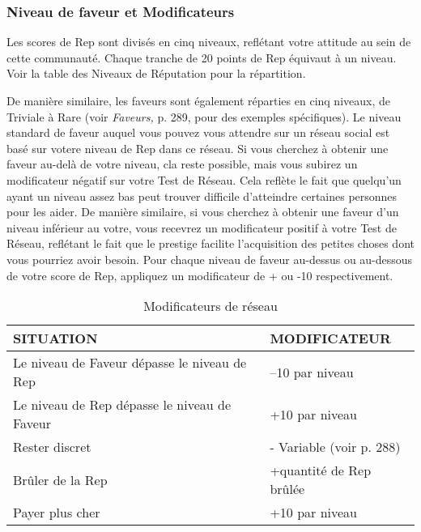 \subsubsection{Niveau de faveur et Modificateurs} 

Les scores de Rep sont divisés en cinq niveaux, reflétant votre attitude au sein de cette communauté. Chaque tranche de 20 points de Rep équivaut à un niveau. Voir la table des Niveaux de Réputation pour la répartition. 

De manière similaire, les faveurs sont également réparties en cinq niveaux, de Triviale à Rare (voir \textit{Faveurs, } p. 289, pour des exemples spécifiques). Le niveau standard de faveur auquel vous pouvez vous attendre sur un réseau social est basé sur votere niveau de Rep dans ce réseau. Si vous cherchez à obtenir une faveur au-delà de votre niveau, cla reste possible, mais vous subirez un modificateur négatif sur votre Test de Réseau. Cela reflète le fait que quelqu'un ayant un niveau assez bas peut trouver difficile d'atteindre certaines personnes pour les aider. De manière similaire, si vous cherchez à obtenir une faveur d'un niveau inférieur au votre, vous recevrez un modificateur positif à votre Test de Réseau, reflétant le fait que le prestige facilite l'acquisition des petites choses dont vous pourriez avoir besoin. Pour chaque niveau de faveur au-dessus ou au-dessous de votre score de Rep, appliquez un modificateur de + ou -10 respectivement. 

\begin{table} \caption{Modificateurs de réseau} \begin{tabular}{|l|l|} \hline

SITUATION &MODIFICATEUR\\ \hline

Le niveau de Faveur dépasse le niveau de Rep &–10 par niveau \\ \hline

Le niveau de Rep dépasse le niveau de Faveur &+10 par niveau \\ \hline

Rester discret &- Variable (voir p. 288) \\ \hline

Brûler de la Rep &+quantité de Rep brûlée\\ \hline

Payer plus cher &+10 par niveau \\ \hline

\end{tabular} \end{table} 

